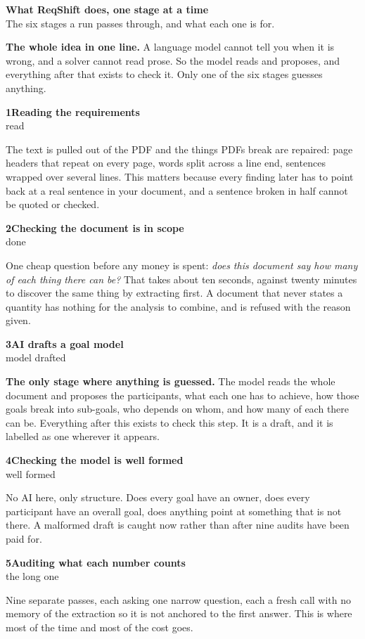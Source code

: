 \documentclass[11pt,a4paper]{article}
\newcommand{\stage}[3]{%
  \vspace{7pt}%
  {\bfseries\color{accent}#1\quad#2}\\[1pt]%
  {\small\color{muted}#3}\par\vspace{2pt}}
\begin{document}
{\LARGE\bfseries What ReqShift does, one stage at a time}\\[3pt]
{\color{muted}The six stages a run passes through, and what each one is for.}

\vspace{4pt}
\begin{keybox}
\textbf{The whole idea in one line.} A language model cannot tell you when it is
wrong, and a solver cannot read prose. So the model reads and proposes, and
everything after that exists to check it. Only one of the six stages guesses
anything.
\end{keybox}

\stage{1}{Reading the requirements}{read}
The text is pulled out of the PDF and the things PDFs break are repaired: page
headers that repeat on every page, words split across a line end, sentences
wrapped over several lines. This matters because every finding later has to point
back at a real sentence in your document, and a sentence broken in half cannot be
quoted or checked.

\stage{2}{Checking the document is in scope}{done}
One cheap question before any money is spent: \emph{does this document say how
many of each thing there can be?} That takes about ten seconds, against twenty
minutes to discover the same thing by extracting first. A document that never
states a quantity has nothing for the analysis to combine, and is refused with the
reason given.

\stage{3}{AI drafts a goal model}{model drafted}
\textbf{The only stage where anything is guessed.} The model reads the whole
document and proposes the participants, what each one has to achieve, how those
goals break into sub-goals, who depends on whom, and how many of each there can
be. Everything after this exists to check this step. It is a draft, and it is
labelled as one wherever it appears.

\stage{4}{Checking the model is well formed}{well formed}
No AI here, only structure. Does every goal have an owner, does every participant
have an overall goal, does anything point at something that is not there. A
malformed draft is caught now rather than after nine audits have been paid for.

\stage{5}{Auditing what each number counts}{the long one}
Nine separate passes, each asking one narrow question, each a fresh call with no
memory of the extraction so it is not anchored to the first answer. This is where
most of the time and most of the cost goes.
\end{document}
